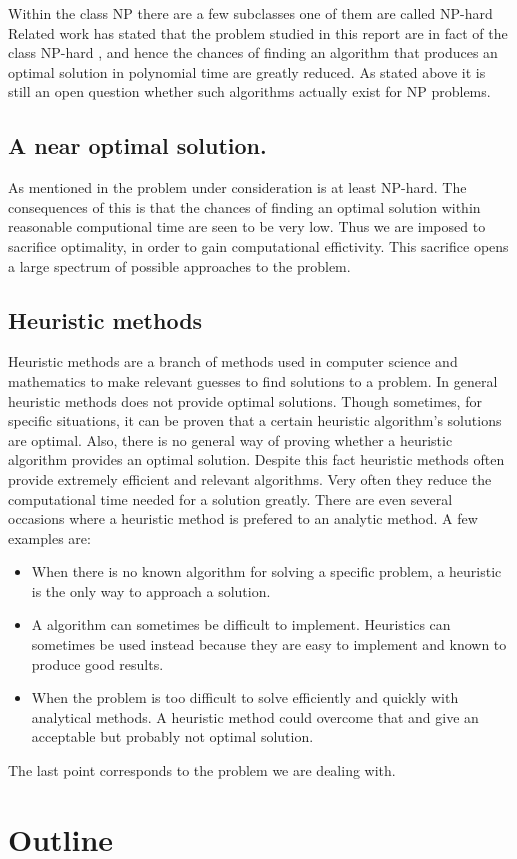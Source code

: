 Within the class NP there are a few subclasses one of them are called NP-hard 
Related work has stated that the problem studied in this report are in fact of the class NP-hard \cite{paper1}, %
and hence the chances of finding an algorithm that produces an optimal solution in polynomial time are greatly reduced. As stated above it is still an open question whether such algorithms actually exist for NP problems. 

\subsection{A near optimal solution.}
As mentioned in \cite{paper1} the problem under consideration is at least NP-hard. The consequences of this is that the chances of finding an optimal solution within reasonable computional time are seen to be very low. Thus we are imposed to sacrifice optimality, in order to gain computational effictivity. This sacrifice opens a large spectrum of possible approaches to the problem.


\subsection{Heuristic methods}
Heuristic methods are a branch of methods used in computer science and mathematics to make relevant guesses to find solutions to a problem. In general heuristic methods does not provide optimal solutions. Though sometimes, for specific situations, it can be proven that a certain heuristic algorithm's solutions are optimal. Also, there is no general way of proving whether a heuristic algorithm provides an optimal solution. Despite this fact heuristic methods often provide extremely efficient and relevant algorithms. Very often they reduce the computational time needed for a solution greatly. There are even several occasions where a heuristic method is prefered to an analytic method. A few examples are:
\begin{itemize}
\item When there is no known algorithm for solving a specific problem, a heuristic is the only way to approach a solution.
\item A algorithm can sometimes be difficult to implement. Heuristics can sometimes be used instead because they are easy to implement and known to produce good results.
\item When the problem is too difficult to solve efficiently and quickly with analytical methods. A heuristic method could overcome that and give an acceptable but probably not optimal solution.
\end{itemize}

The last point corresponds to the problem we are dealing with.
\section{Outline}